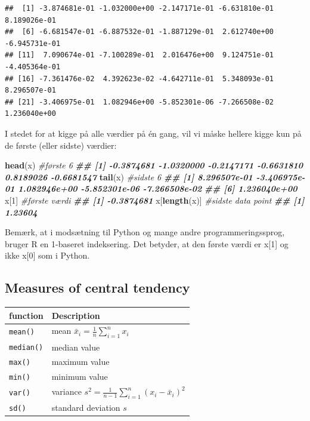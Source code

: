 \documentclass[
]{book}
\newenvironment{Shaded}{\begin{snugshade}}{\end{snugshade}}
\newcommand{\CommentTok}[1]{\textcolor[rgb]{0.56,0.35,0.01}{\textit{#1}}}
\newcommand{\DecValTok}[1]{\textcolor[rgb]{0.00,0.00,0.81}{#1}}
\newcommand{\DocumentationTok}[1]{\textcolor[rgb]{0.56,0.35,0.01}{\textbf{\textit{#1}}}}
\newcommand{\FunctionTok}[1]{\textcolor[rgb]{0.13,0.29,0.53}{\textbf{#1}}}
\newcommand{\NormalTok}[1]{#1}
\theoremstyle{definition}
\theoremstyle{definition}
\theoremstyle{definition}
\theoremstyle{definition}
\theoremstyle{remark}
\begin{document}
\begin{verbatim}
##  [1] -3.874681e-01 -1.032000e+00 -2.147171e-01 -6.631810e-01  8.189026e-01
##  [6] -6.681547e-01 -6.887532e-01 -1.887129e-01  2.612740e+00 -6.945731e-01
## [11]  7.090674e-01 -7.100289e-01  2.016476e+00  9.124751e-01 -4.405364e-01
## [16] -7.361476e-02  4.392623e-02 -4.642711e-01  5.348093e-01  8.296507e-01
## [21] -3.406975e-01  1.082946e+00 -5.852301e-06 -7.266508e-02  1.236040e+00
\end{verbatim}

I stedet for at kigge på alle værdier på én gang, vil vi måske hellere kigge kun på de første (eller sidste) værdier:

\begin{Shaded}
\begin{Highlighting}[]
\FunctionTok{head}\NormalTok{(x) }\CommentTok{\#første 6}
\DocumentationTok{\#\# [1] {-}0.3874681 {-}1.0320000 {-}0.2147171 {-}0.6631810  0.8189026 {-}0.6681547}
\FunctionTok{tail}\NormalTok{(x) }\CommentTok{\#sidste 6}
\DocumentationTok{\#\# [1]  8.296507e{-}01 {-}3.406975e{-}01  1.082946e+00 {-}5.852301e{-}06 {-}7.266508e{-}02}
\DocumentationTok{\#\# [6]  1.236040e+00}
\NormalTok{x[}\DecValTok{1}\NormalTok{] }\CommentTok{\#første værdi}
\DocumentationTok{\#\# [1] {-}0.3874681}
\NormalTok{x[}\FunctionTok{length}\NormalTok{(x)] }\CommentTok{\#sidste data point}
\DocumentationTok{\#\# [1] 1.23604}
\end{Highlighting}
\end{Shaded}

Bemærk, at i modsætning til Python og mange andre programmeringssprog, bruger R en 1-baseret indeksering. Det betyder, at den første værdi er x{[}1{]} og ikke x{[}0{]} som i Python.

\subsection{Measures of central tendency}\label{measures-of-central-tendency}

\begin{longtable}[]{@{}
  >{\raggedright\arraybackslash}p{}
  >{\raggedright\arraybackslash}p{}@{}}
\toprule\noalign{}
\begin{minipage}[b]{\linewidth}\raggedright
function
\end{minipage} & \begin{minipage}[b]{\linewidth}\raggedright
Description
\end{minipage} \\
\midrule\noalign{}
\endhead
\bottomrule\noalign{}
\endlastfoot
\texttt{mean()} & mean \(\bar{x}_{i} = \frac{1}{n}\sum_{i=1}^{n} x_{i}\) \\
\texttt{median()} & median value \\
\texttt{max()} & maximum value \\
\texttt{min()} & minimum value \\
\texttt{var()} & variance \(s^2 = \frac{1}{n-1}\sum_{i=1}^{n} (x_{i} - \bar{x}_{i})^2\) \\
\texttt{sd()} & standard deviation \(s\) \\
\end{longtable}
\end{document}
